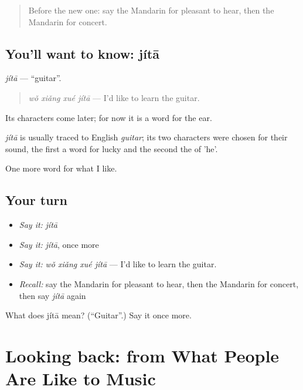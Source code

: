 \label{lesson:ZH-C128-jita}



\begin{quote}
Before the new one: say the Mandarin for pleasant to hear, then the Mandarin for concert.
\end{quote}

\subsection*{You'll want to know: jítā}
\emph{jítā} — \textquotedblleft{}guitar\textquotedblright{}.

\begin{quote}
\emph{wǒ xiǎng xué jítā} — I'd like to learn the guitar.
\end{quote}

Its characters come later; for now it is a word for the ear.

\begin{cousinweb}
\emph{jítā} is usually traced to English \emph{guitar}; its two characters were chosen for their sound, the first a word for lucky and the second the  of 'he'.
\end{cousinweb}

\begin{grammarlens}[title={What you've built}]
One more word for what I like.
\end{grammarlens}

\subsection*{Your turn}
\begin{itemize}
\raggedright
  \item \emph{Say it:} \emph{jítā}
  \item \emph{Say it:} \emph{jítā}, once more
  \item \emph{Say it:} \emph{wǒ xiǎng xué jítā} — I'd like to learn the guitar.
  \item \emph{Recall:} say the Mandarin for pleasant to hear, then the Mandarin for concert, then say \emph{jítā} again
\end{itemize}

\begin{tcolorbox}[breakable,colback=teal!4,colframe=teal!35!black,title={Before you move on}]
What does jítā mean? (\textquotedblleft{}Guitar\textquotedblright{}.) Say it once more.
\end{tcolorbox}
\section[(dialogue)]{Looking back: from What People Are Like to Music}

